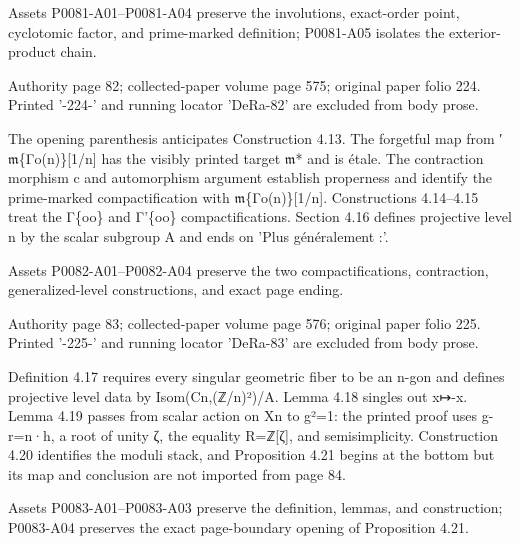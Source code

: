 \documentclass[11pt,a4paper]{article}
\begin{document}
Assets P0081-A01--P0081-A04 preserve the involutions, exact-order point, cyclotomic factor, and prime-marked definition; P0081-A05 isolates the exterior-product chain.


\par\medskip
\hypertarget{D018-P0082}{}
\par\smallskip
Authority page 82; collected-paper volume page 575; original paper folio 224. Printed '-224-' and running locator 'DeRa-82' are excluded from body prose.

The opening parenthesis anticipates Construction 4.13. The forgetful map from ′\ensuremath{\mathfrak{m}}\textunderscore{}\{Γ\textunderscore{}o(n)\}[1/n] has the visibly printed target \ensuremath{\mathfrak{m}}\textunderscore{}* and is étale. The contraction morphism c and automorphism argument establish properness and identify the prime-marked compactification with \ensuremath{\mathfrak{m}}\textunderscore{}\{Γ\textunderscore{}o(n)\}[1/n]. Constructions 4.14--4.15 treat the Γ\textunderscore{}\{oo\} and Γ'\textunderscore{}\{oo\} compactifications. Section 4.16 defines projective level n by the scalar subgroup A and ends on 'Plus généralement :'.

Assets P0082-A01--P0082-A04 preserve the two compactifications, contraction, generalized-level constructions, and exact page ending.


\par\medskip
\hypertarget{D018-P0083}{}
\par\smallskip
Authority page 83; collected-paper volume page 576; original paper folio 225. Printed '-225-' and running locator 'DeRa-83' are excluded from body prose.

Definition 4.17 requires every singular geometric fiber to be an n-gon and defines projective level data by Isom(C\textunderscore{}n,(ℤ/n)²)/A. Lemma 4.18 singles out x↦-x. Lemma 4.19 passes from scalar action on X\textunderscore{}n to g²=1: the printed proof uses g-r=n·h, a root of unity ζ, the equality R=ℤ[ζ], and semisimplicity. Construction 4.20 identifies the moduli stack, and Proposition 4.21 begins at the bottom but its map and conclusion are not imported from page 84.

Assets P0083-A01--P0083-A03 preserve the definition, lemmas, and construction; P0083-A04 preserves the exact page-boundary opening of Proposition 4.21.
\end{document}
